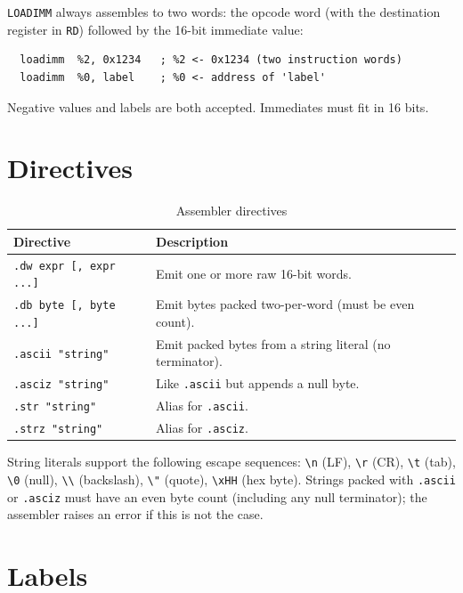 \documentclass[a4paper,12pt]{report}
\newcommand{\asm}[1]{\texttt{#1}}
\newcommand{\field}[1]{\texttt{\small #1}}
\begin{document}
\asm{LOADIMM} always assembles to two words: the opcode word (with the destination register in \field{RD}) followed by the 16-bit immediate value:

\begin{lstlisting}
  loadimm  %2, 0x1234   ; %2 <- 0x1234 (two instruction words)
  loadimm  %0, label    ; %0 <- address of 'label'
\end{lstlisting}

Negative values and labels are both accepted. Immediates must fit in 16 bits.

\section{Directives}

\begin{table}[htbp]
\centering
\caption{Assembler directives}
\begin{tabularx}{\textwidth}{lX}
    \toprule
    \textbf{Directive} & \textbf{Description} \\
    \midrule
    \texttt{.dw expr [, expr ...]} & Emit one or more raw 16-bit words. \\
    \texttt{.db byte [, byte ...]} & Emit bytes packed two-per-word (must be even count). \\
    \texttt{.ascii "string"}       & Emit packed bytes from a string literal (no terminator). \\
    \texttt{.asciz "string"}       & Like \texttt{.ascii} but appends a null byte. \\
    \texttt{.str "string"}         & Alias for \texttt{.ascii}. \\
    \texttt{.strz "string"}        & Alias for \texttt{.asciz}. \\
    \bottomrule
\end{tabularx}
\end{table}

String literals support the following escape sequences: \texttt{{\textbackslash}n} (LF), \texttt{{\textbackslash}r} (CR), \texttt{{\textbackslash}t} (tab), \texttt{{\textbackslash}0} (null), \texttt{{\textbackslash}{\textbackslash}} (backslash), \texttt{{\textbackslash}"} (quote), \texttt{{\textbackslash}xHH} (hex byte). Strings packed with \texttt{.ascii} or \texttt{.asciz} must have an even byte count (including any null terminator); the assembler raises an error if this is not the case.

\section{Labels}
\end{document}
